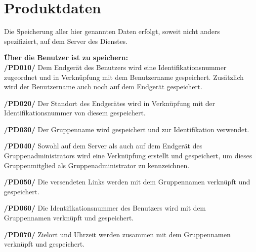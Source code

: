 \section{Produktdaten}

Die Speicherung aller hier genannten Daten erfolgt, soweit nicht anders spezifiziert, auf dem Server des Dienstes.

\textbf{Über die Benutzer ist zu speichern:}\\

\textbf{/PD010/} Dem Endgerät des Benutzers wird eine Identifikationsnummer zugeordnet und in Verknüpfung mit dem Benutzername gespeichert. Zusätzlich wird der
 Benutzername auch noch auf dem Endgerät gespeichert.

\textbf{/PD020/} Der Standort des Endgerätes wird in Verknüpfung mit der Identifikationsnummer von diesem gespeichert.

\textbf{/PD030/} Der Gruppenname wird gespeichert und zur Identifikation verwendet.

\textbf{/PD040/} Sowohl auf dem Server als auch auf dem Endgerät des Gruppenadministrators wird eine Verknüpfung erstellt und gespeichert, um dieses Gruppenmitglied als 
Gruppenadministrator zu kennzeichnen.

\textbf{/PD050/} Die versendeten Links werden mit dem Gruppennamen verknüpft und gespeichert. 

\textbf{/PD060/} Die Identifikationsnummer des Benutzers wird mit dem Gruppennamen verknüpft und gespeichert.

\textbf{/PD070/} Zielort und Uhrzeit werden zusammen mit dem Gruppennamen verknüpft und gespeichert.

